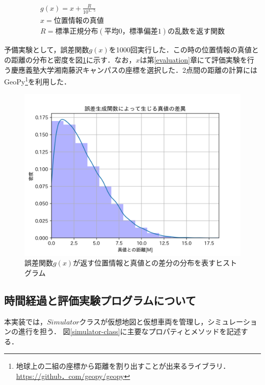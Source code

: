 \begin{align}
	g(x) = x  + \frac{R}{10^{4．5}}                                        \\
	x = 位置情報の真値                                               \\
	R = 標準正規分布(平均0，標準偏差1)の乱数を返す関数 
\end{align}

予備実験として，誤差関数$g(x)$を1000回実行した．この時の位置情報の真値との距離の分布と密度を図\ref{error-kde}に示す．なお，$x$は第\ref{evaluation}章にて評価実験を行う慶應義塾大学湘南藤沢キャンパスの座標を選択した．2点間の距離の計算にはGeoPy\footnote{地球上の二組の座標から距離を割り出すことが出来るライブラリ．\url{https://github．com/geopy/geopy}}を利用した．

\begin{figure}
	\centering
	\includegraphics[width=13cm]{fig/error_kde.png}
	\caption{誤差関数$g(x)$が返す位置情報と真値との差分の分布を表すヒストグラム}
	\label{error-kde}
\end{figure}

\subsection{時間経過と評価実験プログラムについて}
本実装では，$Simulator$クラスが仮想地図と仮想車両を管理し，シミュレーションの進行を担う．
図\ref{simulator-class}に主要なプロパティとメソッドを記述する．

